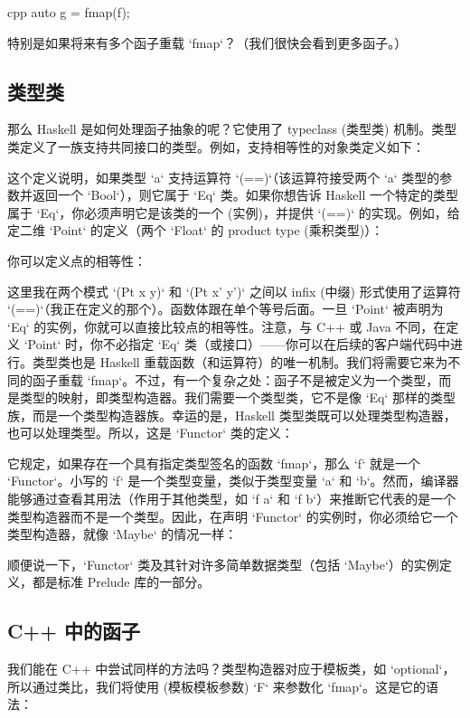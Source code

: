 \begin{snip}{cpp}
auto g = fmap(f);
\end{snip}
特别是如果将来有多个函子重载 `fmap`？（我们很快会看到更多函子。）

\subsection{类型类}

那么 Haskell 是如何处理函子抽象的呢？它使用了 typeclass (类型类) 机制。类型类定义了一族支持共同接口的类型。例如，支持相等性的对象类定义如下：

这个定义说明，如果类型 `a` 支持运算符 `(==)`（该运算符接受两个 `a` 类型的参数并返回一个 `Bool`），则它属于 `Eq` 类。如果你想告诉 Haskell 一个特定的类型属于 `Eq`，你必须声明它是该类的一个  (实例)，并提供 `(==)` 的实现。例如，给定二维 `Point` 的定义（两个 `Float` 的 product type (乘积类型)）：

你可以定义点的相等性：

这里我在两个模式 `(Pt x y)` 和 `(Pt x' y')` 之间以 infix (中缀) 形式使用了运算符 `(==)`（我正在定义的那个）。函数体跟在单个等号后面。一旦 `Point` 被声明为 `Eq` 的实例，你就可以直接比较点的相等性。注意，与 C++ 或 Java 不同，在定义 `Point` 时，你不必指定 `Eq` 类（或接口）——你可以在后续的客户端代码中进行。类型类也是 Haskell 重载函数（和运算符）的唯一机制。我们将需要它来为不同的函子重载 `fmap`。不过，有一个复杂之处：函子不是被定义为一个类型，而是类型的映射，即类型构造器。我们需要一个类型类，它不是像 `Eq` 那样的类型族，而是一个类型构造器族。幸运的是，Haskell 类型类既可以处理类型构造器，也可以处理类型。所以，这是 `Functor` 类的定义：

它规定，如果存在一个具有指定类型签名的函数 `fmap`，那么 `f` 就是一个 `Functor`。小写的 `f` 是一个类型变量，类似于类型变量 `a` 和 `b`。然而，编译器能够通过查看其用法（作用于其他类型，如 `f a` 和 `f b`）来推断它代表的是一个类型构造器而不是一个类型。因此，在声明 `Functor` 的实例时，你必须给它一个类型构造器，就像 `Maybe` 的情况一样：

顺便说一下，`Functor` 类及其针对许多简单数据类型（包括 `Maybe`）的实例定义，都是标准 Prelude 库的一部分。

\subsection{C++ 中的函子}

我们能在 C++ 中尝试同样的方法吗？类型构造器对应于模板类，如 `optional`，所以通过类比，我们将使用  (模板模板参数) `F` 来参数化 `fmap`。这是它的语法：

